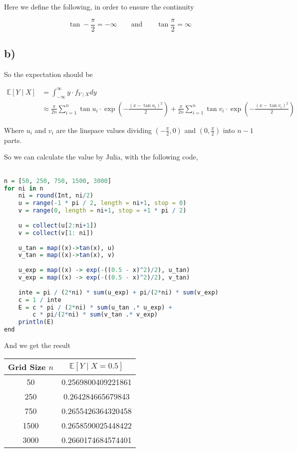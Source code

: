 \documentclass[12pt]{article}
\begin{document}
\begin{flushleft}
\qquad Here we define the following, in order to ensure the continuity

$$
\tan -\frac{\pi}{2} = -\infty \qquad \text{and} \qquad  \tan \frac{\pi}{2} = \infty
$$

\subsection*{b)}

\qquad So the expectation should be

\begin{align*}
\mathbb{E} \left[ Y\mid X \right] &= \int_{-\infty}^{\infty} y \cdot f_{Y\mid X} dy\\
& \approx \frac{\pi}{2n}\sum_{i=1}^n \tan u_i \cdot \exp(-\frac{(x - \tan u_i)^2}{2}) + \frac{\pi}{2n}\sum_{i=1}^n \tan v_i \cdot \exp(-\frac{(x - \tan v_i)^2}{2})
\end{align*}

\qquad Where $u_i$ and $v_i$ are the linspace values dividing $(-\frac{\pi}{2}, 0)$ and $(0, \frac{\pi}{2})$ into $n-1$ parts.

\newpage

\qquad So we can calculate the value by Julia, with the following code,

\begin{lstlisting}[language=R]

n = [50, 250, 750, 1500, 3000]
for ni in n
    ni = round(Int, ni/2)
    u = range(-1 * pi / 2, length = ni+1, stop = 0)
    v = range(0, length = ni+1, stop = +1 * pi / 2)
        
    u = collect(u[2:ni+1])
    v = collect(v[1: ni])
        
    u_tan = map((x)->tan(x), u)
    v_tan = map((x)->tan(x), v)
        
    u_exp = map((x) -> exp(-((0.5 - x)^2)/2), u_tan)
    v_exp = map((x) -> exp(-((0.5 - x)^2)/2), v_tan)
        
    inte = pi / (2*ni) * sum(u_exp) + pi/(2*ni) * sum(v_exp)
    c = 1 / inte
    E = c * pi / (2*ni) * sum(u_tan .* u_exp) + 
        c * pi/(2*ni) * sum(v_tan .* v_exp)
    println(E)
end        
\end{lstlisting} 
    

\qquad And we get the result

\begin{table}[h]
\centering
\begin{tabular}{cc}
\hline
Grid Size $n$ & $\mathbb{E}\left[Y\mid X = 0.5\right]$ \\
\hline
50    &  0.2569800409221861  \\
250   &  0.264284665679843   \\
750   &  0.2655426364320458  \\
1500  &  0.2658590025448422  \\
3000  &  0.2660174684574401  \\
\hline
\end{tabular}
\end{table}


\end{flushleft}
\end{document}
